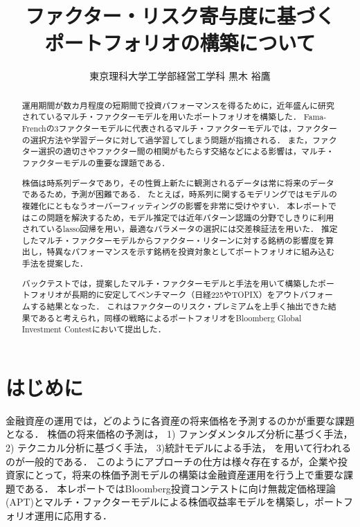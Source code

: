 ﻿\documentclass[a4paper]{jarticle}
\begin{document}
\title{ファクター・リスク寄与度に基づく\\ポートフォリオの構築について\\}
\author{東京理科大学工学部経営工学科 \quad 黒木 裕鷹}
\maketitle
\begin{abstract}

運用期間が数カ月程度の短期間で投資パフォーマンスを得るために，近年盛んに研究されているマルチ・ファクターモデルを用いたポートフォリオを構築した．
Fama-Frenchの3ファクターモデルに代表されるマルチ・ファクターモデルでは，ファクターの選択方法や学習データに対して過学習してしまう問題が指摘される．
また，ファクター選択の適切さやファクター間の相関がもたらす交絡などによる影響は，マルチ・ファクターモデルの重要な課題である．

株価は時系列データであり，その性質上新たに観測されるデータは常に将来のデータであるため，予測が困難である．
たとえば，時系列に関するモデリングではモデルの複雑化にともなうオーバーフィッティングの影響を非常に受けやすい．
本レポートではこの問題を解決するため，モデル推定では近年パターン認識の分野でしきりに利用されているlasso回帰を用い，最適なパラメータの選択には交差検証法を用いた．
推定したマルチ・ファクターモデルからファクター・リターンに対する銘柄の影響度を算出し，特異なパフォーマンスを示す銘柄を投資対象としてポートフォリオに組み込む手法を提案した．

バックテストでは，提案したマルチ・ファクターモデルと手法を用いて構築したポートフォリオが長期的に安定してベンチマーク（日経225やTOPIX）をアウトパフォームする結果となった． 
これはファクターのリスク・プレミアムを上手く抽出できた結果であると考えられ，同様の戦略によるポートフォリオをBloomberg Global Investment Contestにおいて提出した．
\end{abstract}



\newpage
{}
\newpage
\tableofcontents

\newpage

\listoftables

\listoffigures
\newpage






\section{はじめに}
金融資産の運用では，どのように各資産の将来価格を予測するのかが重要な課題となる．
株価の将来価格の予測は，
1) ファンダメンタルズ分析に基づく手法，
2) テクニカル分析に基づく手法，
3)統計モデルによる手法，
を用いて行われるのが一般的である．
このようにアプローチの仕方は様々存在するが，企業や投資家にとって，将来の株価予測モデルの構築は金融資産運用を行う上で重要な課題である．
本レポートではBloomberg投資コンテストに向け無裁定価格理論(APT)とマルチ・ファクターモデルによる株価収益率モデルを構築し，ポートフォリオ運用に応用する．
\end{document}

